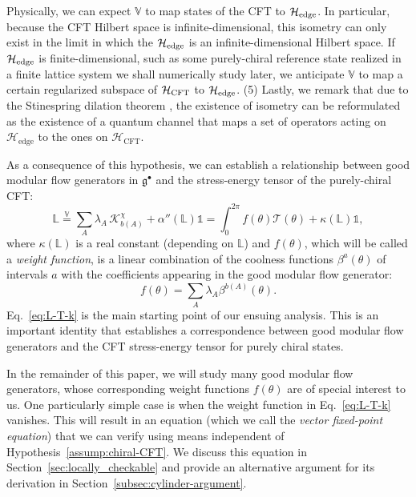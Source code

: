 \documentclass[12pt, nofootinbib]{article}
\theoremstyle{plain}
\theoremstyle{assumption}
\theoremstyle{definition}
\theoremstyle{plain}
\theoremstyle{plain}
\theoremstyle{plain}
\theoremstyle{plain}
\theoremstyle{plain}
\newcommand{\calH}{{\mathcal H}}
\def\veq{\stackrel{\mathbb{V}}{=}}
\def\Lb{\mathbb{L}}
\def\Kcft{\mathscr{K}}
\def\Tcft{\mathscr{T}}
\begin{document}
Physically, we can expect $\mathbb{V}$ to map states of the CFT to $\mathcal{H}_{\rm edge}$. In particular, because the CFT Hilbert space is infinite-dimensional, this isometry can only exist in the limit in which the $\mathcal{H}_{\rm edge}$ is an infinite-dimensional Hilbert space. If $\mathcal{H}_{\rm edge}$ is finite-dimensional, such as some purely-chiral reference state realized in a finite lattice system we shall numerically study later, we anticipate $\mathbb{V}$ to map a certain regularized subspace of $\mathcal{H}_{\rm CFT}$ to $\mathcal{H}_{\rm edge}$. (5) Lastly, we remark that due to the Stinespring dilation theorem \cite{Stinespring_1955}, the existence of isometry can be reformulated as the existence of a quantum channel that maps a set of operators acting on $\calH_{\mathrm{edge}}$ to the ones on $\calH_{\mathrm{CFT}}$.

As a consequence of this hypothesis, we can establish a relationship between good modular flow generators in $\mathfrak{g}^\bullet$ and the stress-energy tensor of the purely-chiral CFT:
\begin{equation}\label{eq:L-T-k}
    \Lb \veq \sum_A \lambda_A \, \Kcft^{\chi}_{b(A)} + \alpha''(\mathbb{L}) \mathbb{1}    
    =   \int_{0}^{2\pi}f(\theta) \Tcft(\theta) + \kappa(\mathbb{L}) \mathbb{1}, 
\end{equation}
where $\kappa(\mathbb{L})$ is a real constant (depending on $\mathbb{L}$) and $f(\theta)$, which will be called a \emph{weight function}, is a linear combination of the coolness functions $\beta^a(\theta)$ of intervals $a$ with the coefficients appearing in the good modular flow generator:  
\begin{equation}
    f(\theta) = \sum_A \lambda_A \beta^{b(A)}(\theta).
\end{equation}
Eq.~\eqref{eq:L-T-k} is the main starting point of our ensuing analysis. This is an important identity that establishes a correspondence between good modular flow generators and the CFT stress-energy tensor for purely chiral states.
 

In the remainder of this paper, we will study many good modular flow generators, whose corresponding weight functions $f(\theta)$ are of special interest to us. One particularly simple case is when the weight function in Eq.~\eqref{eq:L-T-k} vanishes. This will result in an equation (which we call the \emph{vector fixed-point equation}) that we can verify using means independent of Hypothesis~\ref{assump:chiral-CFT}. We discuss this equation in Section~\ref{sec:locally_checkable} and provide an alternative argument for its derivation in Section~\ref{subsec:cylinder-argument}.
\end{document}
